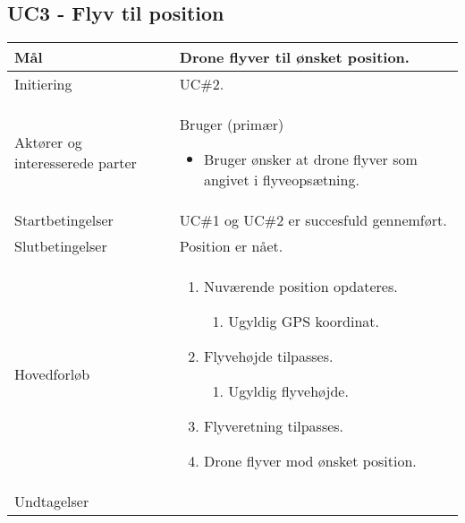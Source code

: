 \subsection*{UC3 - Flyv til position}

\begin{table}[H]
\begin{tabular}{|l|p{10cm}|}
\hline

Mål	 							& Drone flyver til ønsket position. \\\hline
Initiering 							& UC\#2. \\\hline
Aktører og interesserede parter			& Bruger (primær) 
										\begin{itemize}
											\item Bruger ønsker at drone flyver som angivet i flyveopsætning.
										\end{itemize} \\\hline
Startbetingelser							& UC\#1 og UC\#2 er succesfuld gennemført. \\\hline
Slutbetingelser						& Position er nået. \\\hline
Hovedforløb				&
 
									\renewcommand{\labelenumi}{\arabic{enumi}.}
									\renewcommand{\labelenumii}{\Roman{enumii}:}

									\begin{enumerate}[topsep=0.0cm, leftmargin=0.5cm]
										\item Nuværende position opdateres.
											\begin{enumerate}[partopsep=4cm, topsep=0cm, leftmargin=1cm]
												\item Ugyldig GPS koordinat.
											\end{enumerate}
										\item Flyvehøjde tilpasses.
											\begin{enumerate}[partopsep=4cm, topsep=0cm, leftmargin=1cm]
												\item Ugyldig flyvehøjde.
											\end{enumerate}
										\item Flyveretning tilpasses.
										\item Drone flyver mod ønsket position.
									\end{enumerate} \\\hline	

Undtagelser							& 


\end{tabular}
\end{table}
